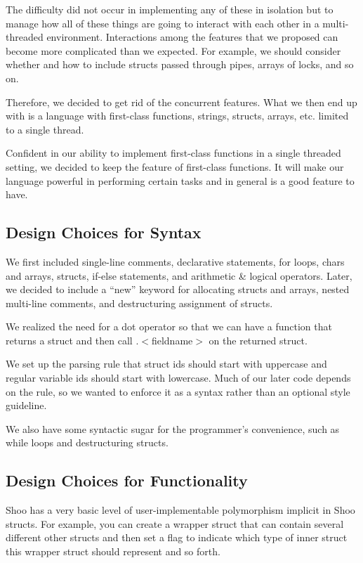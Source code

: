 \documentclass[12pt]{article}
\begin{document}
The difficulty did not occur in implementing any of these in isolation but to manage how all of these things are going to interact with each other in a multi-threaded environment. Interactions among the features that we proposed can become more complicated than we expected. For example, we should consider whether and how to include structs passed through pipes, arrays of locks, and so on. 

Therefore, we decided to get rid of the concurrent features. What we then end up with is a language with first-class functions, strings, structs, arrays, etc. limited to a single thread. 

Confident in our ability to implement first-class functions in a single threaded setting, we decided to keep the feature of first-class functions. It will make our language powerful in performing certain tasks and in general is a good feature to have.

\subsection{Design Choices for Syntax}

We first included single-line comments, declarative statements, for loops, chars and arrays, structs, if-else statements, and arithmetic \& logical operators. Later, we decided to include a ``new'' keyword for allocating structs and arrays, nested multi-line comments, and destructuring assignment of structs.

We realized the need for a dot operator so that we can have a function that returns a struct and then call .$<$fieldname$>$ on the returned struct.

We set up the parsing rule that struct ids should start with uppercase and regular variable ids should start with lowercase. Much of our later code depends on the rule, so we wanted to enforce it as a syntax rather than an optional style guideline.

We also have some syntactic sugar for the programmer's convenience, such as while loops and destructuring structs.

\subsection{Design Choices for Functionality}

Shoo has a very basic level of user-implementable polymorphism implicit in Shoo structs. For example, you can create a wrapper struct that can contain several different other structs and then set a flag to indicate which type of inner struct this wrapper struct should represent and so forth.
\end{document}
